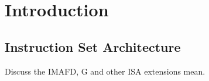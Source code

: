 \chapter{Introduction}
\label{chapter:Introduction}

\section{Instruction Set Architecture}

Discuss the IMAFD, G and other ISA extensions mean.


